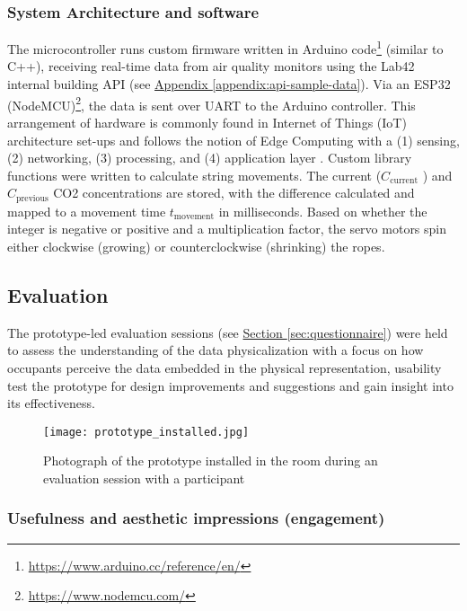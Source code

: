 \subsubsection{System Architecture and software}

The microcontroller runs custom firmware written in Arduino code\footnote{\url{https://www.arduino.cc/reference/en/}} (similar to C++), receiving real-time data from air quality monitors using the Lab42 internal building API (see \hyperref[appendix:api-sample-data]{Appendix \ref*{appendix:api-sample-data}}). Via an ESP32 (NodeMCU)\footnote{\url{https://www.nodemcu.com/}}, the data is sent over UART to the Arduino controller. This arrangement of hardware is commonly found in Internet of Things (IoT) architecture set-ups and follows the notion of Edge Computing with a (1) sensing, (2) networking, (3) processing, and (4) application layer \cite{li_edge-oriented_2019, idrees_edge_2018}. Custom library functions were written to calculate string movements. The current (\( C_{\text{current}} \) ) and \( C_{\text{previous}} \) CO2 concentrations are stored, with the difference calculated and mapped to a movement time \( t_{\text{movement}} \) in milliseconds. Based on whether the integer is negative or positive and a multiplication factor, the servo motors spin either clockwise (growing) or counterclockwise (shrinking) the ropes.


\subsection{Evaluation}
\label{sec:evaluation_results}

The prototype-led evaluation sessions (see \hyperref[sec:questionnaire]{Section \ref*{sec:questionnaire}}) were held to assess the understanding of the data physicalization with a focus on how occupants perceive the data embedded in the physical representation, usability test the prototype for design improvements and suggestions and gain insight into its effectiveness.

\begin{figure}[b]
    \centering
    \texttt{[image: prototype\_installed.jpg]}
    \caption{Photograph of the prototype installed in the room during an evaluation session with a participant }
    \label{fig:complexity}
\end{figure}

\subsubsection{Usefulness and aesthetic impressions (engagement)}

